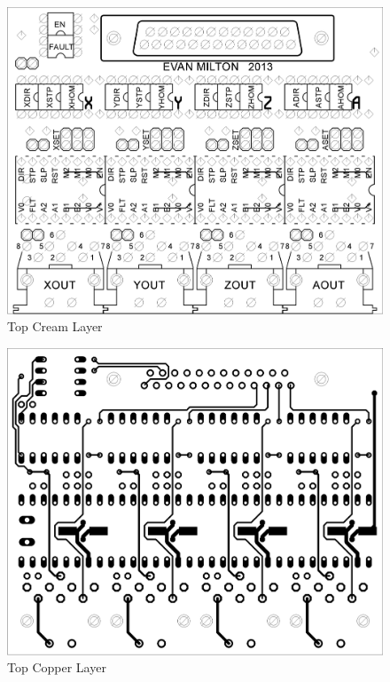 \begin{figure}[h]
	\centering
	\includegraphics[width=1\textwidth]{pcb-design/topcream.png}
	\caption{Top Cream Layer}
	\label{fig:front}
\end{figure}
\begin{figure}[h]
	\centering
	\includegraphics[width=1\textwidth]{pcb-design/toproute.png}
	\caption{Top Copper Layer}
	\label{fig:front}
\end{figure}
